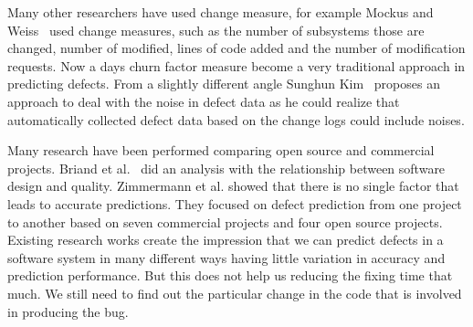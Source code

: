 \documentclass[10pt, conference]{IEEEtran}
\begin{document}
Many other researchers have used change measure, for example Mockus and Weiss~\cite{Mockus2000Bell} used change measures, such as the number of subsystems those are changed, number of modified, lines of code added and the number of modification requests. Now a days churn factor measure become a very traditional approach in predicting defects. From a slightly different angle Sunghun Kim~\cite{Kim2011ICSE} proposes an approach to deal with the noise in defect data as he could realize that automatically collected defect data based on the change logs could include noises.

Many research have been performed comparing open source and commercial projects. Briand et al.~\cite{Briand1999ICSE} did an analysis with the relationship between software design and quality. Zimmermann et al.\cite{Zimmermann2009ESECS} showed that there is no single factor that leads to accurate predictions. They focused on defect prediction from one project to another based on seven commercial projects and four open source projects. Existing research works create the impression that we can predict defects in a software system in many different ways having little variation in accuracy and prediction performance. But this does not help us reducing the fixing time that much. We still need to find out the particular change in the code that is involved in producing the bug.
\end{document}
